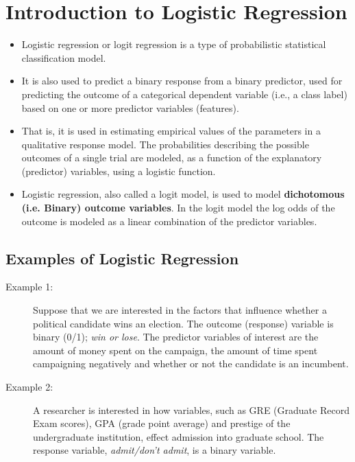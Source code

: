 \documentclass[a4paper,12pt]{article}
\begin{document}
\section{Introduction to Logistic Regression}
\begin{itemize}
	\item Logistic regression or logit regression is a type of probabilistic statistical classification model.
	
	\item It is also used to predict a binary response from a binary predictor, used for predicting the outcome of a categorical dependent variable (i.e., a class label) based on one or more predictor variables (features). 
	
	\item That is, it is used in estimating empirical values of the parameters in a qualitative response model. The probabilities describing the possible outcomes of a single trial are modeled, as a function of the explanatory (predictor) variables, using a logistic function. 
	
	\item Logistic regression, also called a logit model, is used to model \textbf{dichotomous (i.e. Binary) outcome variables}. In the logit model the log odds of the outcome is modeled as a linear combination of the predictor variables.
\end{itemize}


\subsection{Examples of Logistic Regression}

\begin{description}
	\item[Example 1:]  Suppose that we are interested in the factors that influence whether a political candidate wins an election.  The outcome (response) variable is binary (0/1); \textit{ win or lose}.  The predictor variables of interest are the amount of money spent on the campaign, the amount of time spent campaigning negatively and whether or not the candidate is an incumbent.
	
	\item[Example 2:]  A researcher is interested in how variables, such as GRE (Graduate Record Exam scores), GPA (grade point average) and prestige of the undergraduate institution, effect admission into graduate school. The response variable, \textit{admit/don't admit}, is a binary variable.
\end{description}
\end{document}
